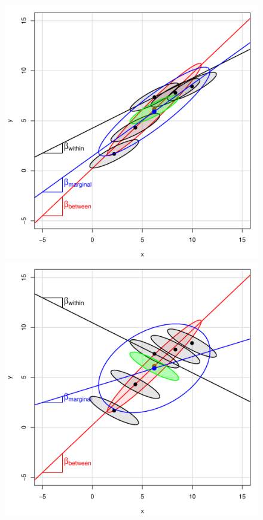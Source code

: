 \begin{figure}[htb]
 \begin{minipage}[b]{.49\linewidth}
  \centering
  \includegraphics[width=1\linewidth]{fig/between-within1}
 \end{minipage}%
 \hfill
 \begin{minipage}[b]{.49\linewidth}
  \centering
  \includegraphics[width=1\linewidth]{fig/between-within2}

\end{minipage}
\end{figure}
